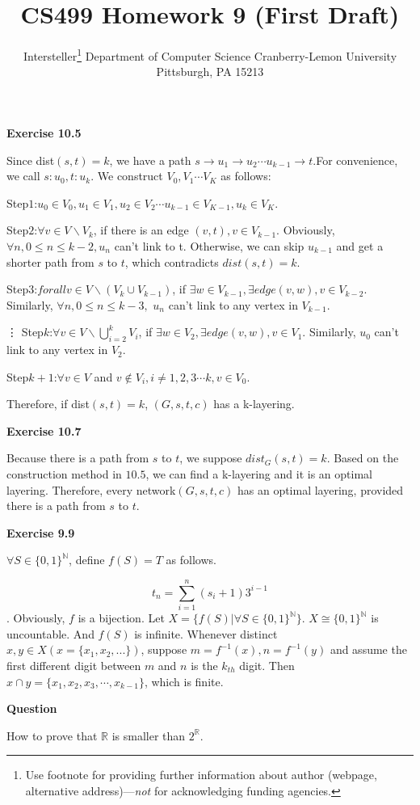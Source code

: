 \documentclass{article} %
\title{CS499 Homework 9 (First Draft)}
\author{
	Intersteller\thanks{ Use footnote for providing further information
		about author (webpage, alternative address)---\emph{not} for acknowledging
		funding agencies.}
	Department of Computer Science
	Cranberry-Lemon University
	Pittsburgh, PA 15213
}
\begin{document}
	
	
	\maketitle
	
	
	\textbf{Exercise 10.5}\par
    Since dist$(s,t)=k$, we have a path $s\rightarrow u_1\rightarrow u_2 \cdots u_{k-1}\rightarrow t$.For convenience, we call $s:u_0,t:u_k$. We construct $V_0, V_1\cdots V_K$ as follows:\par
    Step$1$:$u_0\in V_0, u_1\in V_1, u_2\in V_2\cdots u_{k-1}\in V_{K-1}, u_k\in V_K.$\par
    Step$2$:$\forall v\in V \backslash V_k$, if there is an edge $(v,t), v\in V_{k-1}$. Obviously, $\forall n, 0\leq n \leq k-2, u_n$ can't link to t. Otherwise, we can skip $u_{k-1}$ and get a shorter path from $s$ to $t$, which contradicts $dist(s,t)=k$.\par
    Step$3$:$forall v\in V \backslash (V_k\cup V_{k-1})$, if $\exists w \in V_{k-1}, \exists edge (v,w), v\in V_{k-2}.$ Similarly, $\forall n, 0\leq n\leq k-3,$ $u_n$ can't link to any vertex in $V_{k-1}.$\par
    \vdots
    Step$k$:$\forall v\in V \backslash \bigcup_{i=2}^kV_i$, if $\exists w\in V_2, \exists edge (v,w), v\in V_1.$ Similarly, $u_0$ can't link to any vertex in $V_2$.\par
    Step$k+1$:$\forall v \in V $ and $ v \notin V_i, i \neq 1,2,3\cdots k, v \in V_0$.\par
    Therefore, if dist$(s,t)=k$, $(G,s,t,c)$ has a k-layering.


    \textbf{Exercise 10.7}\par
    Because there is a path from $s$ to $t$, we suppose $dist_G(s,t)=k$. Based on the construction method in $10.5$, we can find a k-layering and it is an optimal layering. Therefore, every network$(G,s,t,c)$ has an optimal layering, provided there is a path from $s$ to $t$.
	
  \textbf{Exercise 9.9}\par
	  $\forall S\in {\{0,1\}}^{\mathbb{N}}$, define $f(S)=T$ as follows.\par
 $$t_n=\sum_{i=1}^n(s_i+1)3^{i-1}$$.
Obviously, $f$ is a bijection. Let $X=\{f(S)|\forall S\in {\{0,1\}}^{\mathbb{N}}\}$. $X\cong {\{0,1\}}^{\mathbb{N}}$ is uncountable. And $f(S)$ is infinite. Whenever distinct $x,y \in X(x=\{x_1,x_2,...\})$, suppose $m=f^{-1}(x),n=f^{-1}(y)$ and assume the first different digit between $m$ and $n$ is the $k_{th}$ digit. Then $x\cap y=\{x_1,x_2,x_3,\cdots,x_{k-1}\}$, which is finite.
	
		\textbf{Question}\par
	 How to prove that ${\mathbb{R}}$ is smaller than $2^{\mathbb{R}}$.
	
\end{document}
